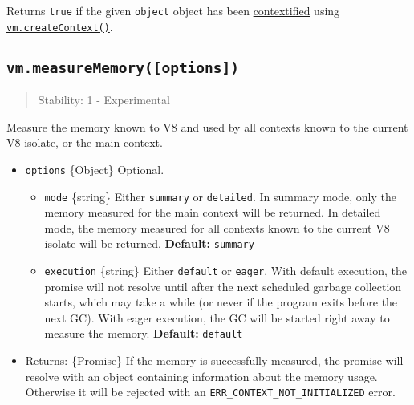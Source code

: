 Returns \texttt{true} if the given \texttt{object} object has been
\hyperref[what-does-it-mean-to-contextify-an-object]{contextified} using
\hyperref[vmcreatecontextcontextobject-options]{\texttt{vm.createContext()}}.

\subsection{\texorpdfstring{\texttt{vm.measureMemory({[}options{]})}}{vm.measureMemory({[}options{]})}}\label{vm.measurememoryoptions}

\begin{quote}
Stability: 1 - Experimental
\end{quote}

Measure the memory known to V8 and used by all contexts known to the
current V8 isolate, or the main context.

\begin{itemize}
\tightlist
\item
  \texttt{options} \{Object\} Optional.

  \begin{itemize}
  \tightlist
  \item
    \texttt{mode} \{string\} Either
    \texttt{\textquotesingle{}summary\textquotesingle{}} or
    \texttt{\textquotesingle{}detailed\textquotesingle{}}. In summary
    mode, only the memory measured for the main context will be
    returned. In detailed mode, the memory measured for all contexts
    known to the current V8 isolate will be returned. \textbf{Default:}
    \texttt{\textquotesingle{}summary\textquotesingle{}}
  \item
    \texttt{execution} \{string\} Either
    \texttt{\textquotesingle{}default\textquotesingle{}} or
    \texttt{\textquotesingle{}eager\textquotesingle{}}. With default
    execution, the promise will not resolve until after the next
    scheduled garbage collection starts, which may take a while (or
    never if the program exits before the next GC). With eager
    execution, the GC will be started right away to measure the memory.
    \textbf{Default:}
    \texttt{\textquotesingle{}default\textquotesingle{}}
  \end{itemize}
\item
  Returns: \{Promise\} If the memory is successfully measured, the
  promise will resolve with an object containing information about the
  memory usage. Otherwise it will be rejected with an
  \texttt{ERR\_CONTEXT\_NOT\_INITIALIZED} error.
\end{itemize}

